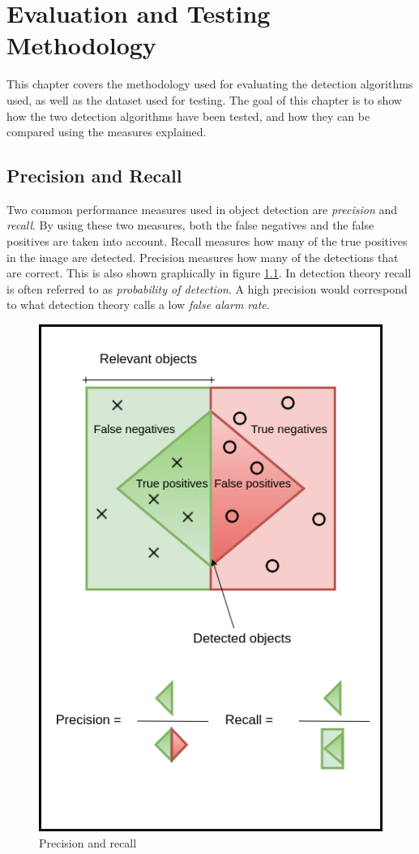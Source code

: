 
\chapter{Evaluation and Testing Methodology}
This chapter covers the methodology used for evaluating the detection algorithms used, as well as the dataset used for testing. The goal of this chapter is to show how the two detection algorithms have been tested, and how they can be compared using the measures explained.

\section{Precision and Recall}
\label{sec:prec_rec}

Two common performance measures used in object detection are \textit{precision} and \textit{recall}. By using these two measures, both the false negatives and the false positives are taken into account. Recall measures how many of the true positives in the image are detected. Precision measures how many of the detections that are correct. This is also shown graphically in figure \ref{fig:prec_recall}. In detection theory recall is often referred to as \textit{probability of detection}. A high precision would correspond to what detection theory calls a low \textit{false alarm rate}.

\begin{figure}[h!]
    \centering
    \includegraphics[scale=0.35]{fig/recall_precision.png}
    \caption{Precision and recall}
    \label{fig:prec_recall}
\end{figure}


